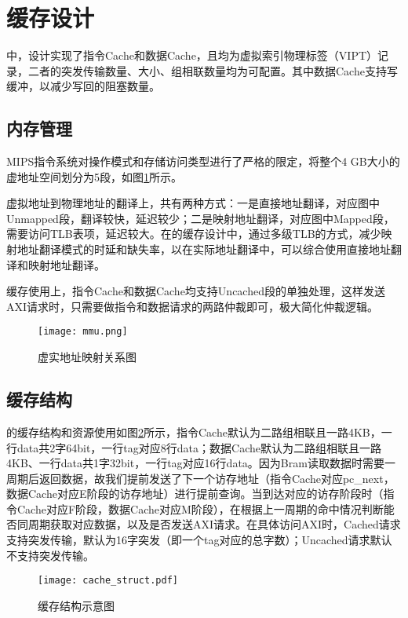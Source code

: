 \section{缓存设计}

\cpuname 中，设计实现了指令Cache和数据Cache，且均为虚拟索引物理标签（VIPT）记录，二者的突发传输数量、大小、组相联数量均为可配置。其中数据Cache支持写缓冲，以减少写回的阻塞数量。

\subsection{内存管理}
MIPS指令系统对操作模式和存储访问类型进行了严格的限定，将整个4 GB大小的虚地址空间划分为5段，如图\ref{img:mmu}所示。

虚拟地址到物理地址的翻译上，共有两种方式：一是直接地址翻译，对应图中Unmapped段，翻译较快，延迟较少；二是映射地址翻译，对应图中Mapped段，需要访问TLB表项，延迟较大。在\cpuname 的缓存设计中，通过多级TLB的方式，减少映射地址翻译模式的时延和缺失率，以在实际地址翻译中，可以综合使用直接地址翻译和映射地址翻译。

缓存使用上，指令Cache和数据Cache均支持Uncached段的单独处理，这样发送AXI请求时，只需要做指令和数据请求的两路仲裁即可，极大简化仲裁逻辑。

\begin{figure}[htpb]
    \centering
    \texttt{[image: mmu.png]}
    \caption{虚实地址映射关系图}
    \label{img:mmu}
\end{figure}

\subsection{缓存结构}
\cpuname 的缓存结构和资源使用如图\ref{img:struct}所示，指令Cache默认为二路组相联且一路4KB，一行data共2字64bit，一行tag对应8行data；数据Cache默认为二路组相联且一路4KB、一行data共1字32bit，一行tag对应16行data。因为Bram读取数据时需要一周期后返回数据，故我们提前发送了下一个访存地址（指令Cache对应pc\_next，数据Cache对应E阶段的访存地址）进行提前查询。当到达对应的访存阶段时（指令Cache对应F阶段，数据Cache对应M阶段），在根据上一周期的命中情况判断能否同周期获取对应数据，以及是否发送AXI请求。在具体访问AXI时，Cached请求支持突发传输，默认为16字突发（即一个tag对应的总字数）；Uncached请求默认不支持突发传输。

\begin{figure}[htpb]
    \centering
    \texttt{[image: cache\_struct.pdf]}
    \caption{\cpuname 缓存结构示意图}
    \label{img:struct}
\end{figure}

